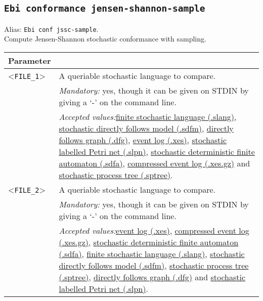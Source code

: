 {\subsection{\texttt{Ebi conformance jensen-shannon-sample}}
\label{command:Ebi conformance jensen-shannon-sample}
Alias: \texttt{Ebi conf jssc-sample}.\\
Compute Jensen-Shannon stochastic conformance with sampling.\\
\begin{tabularx}{\linewidth}{lX}
\toprule
Parameter \\\midrule
<\texttt{FILE\_1}>&A queriable stochastic language to compare.\\
&\textit{Mandatory:} \quad yes, though it can be given on STDIN by giving a `-' on the command line.\\
&\textit{Accepted values:}\quad \hyperref[filehandler:finite stochastic language]{finite stochastic language (.slang)}, \hyperref[filehandler:stochastic directly follows model]{stochastic directly follows model (.sdfm)}, \hyperref[filehandler:directly follows graph]{directly follows graph (.dfg)}, \hyperref[filehandler:event log]{event log (.xes)}, \hyperref[filehandler:stochastic labelled Petri net]{stochastic labelled Petri net (.slpn)}, \hyperref[filehandler:stochastic deterministic finite automaton]{stochastic deterministic finite automaton (.sdfa)}, \hyperref[filehandler:compressed event log]{compressed event log (.xes.gz)} and \hyperref[filehandler:stochastic process tree]{stochastic process tree (.sptree)}.\\
<\texttt{FILE\_2}>&A queriable stochastic language to compare.\\
&\textit{Mandatory:} \quad yes, though it can be given on STDIN by giving a `-' on the command line.\\
&\textit{Accepted values:}\quad \hyperref[filehandler:event log]{event log (.xes)}, \hyperref[filehandler:compressed event log]{compressed event log (.xes.gz)}, \hyperref[filehandler:stochastic deterministic finite automaton]{stochastic deterministic finite automaton (.sdfa)}, \hyperref[filehandler:finite stochastic language]{finite stochastic language (.slang)}, \hyperref[filehandler:stochastic directly follows model]{stochastic directly follows model (.sdfm)}, \hyperref[filehandler:stochastic process tree]{stochastic process tree (.sptree)}, \hyperref[filehandler:directly follows graph]{directly follows graph (.dfg)} and \hyperref[filehandler:stochastic labelled Petri net]{stochastic labelled Petri net (.slpn)}.\\

\end{tabularx}}
